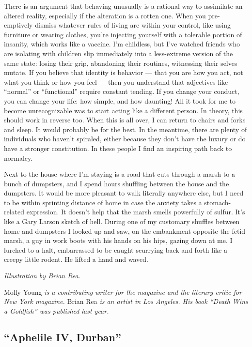 There is an argument that behaving unusually is a rational way to
assimilate an altered reality, especially if the alteration is a rotten
one. When you pre-emptively dismiss whatever rules of living are within
your control, like using furniture or wearing clothes, you're injecting
yourself with a tolerable portion of insanity, which works like a
vaccine. I'm childless, but I've watched friends who are isolating with
children slip immediately into a less-extreme version of the same state:
losing their grip, abandoning their routines, witnessing their selves
mutate. If you believe that identity is behavior --- that you are how
you act, not what you think or how you feel --- then you understand that
adjectives like ``normal'' or ``functional'' require constant tending.
If you change your conduct, you can change your life: how simple, and
how daunting! All it took for me to become unrecognizable was to start
acting like a different person. In theory, this should work in reverse
too. When this is all over, I can return to chairs and forks and sleep.
It would probably be for the best. In the meantime, there are plenty of
individuals who haven't spiraled, either because they don't have the
luxury or do have a stronger constitution. In these people I find an
inspiring path back to normalcy.

Next to the house where I'm staying is a road that cuts through a marsh
to a bunch of dumpsters, and I spend hours shuffling between the house
and the dumpsters. It would be more pleasant to walk literally anywhere
else, but I need to be within sprinting distance of home in case the
anxiety takes a stomach-related expression. It doesn't help that the
marsh smells powerfully of sulfur. It's like a Gary Larson sketch of
hell. During one of my customary shuffles between home and dumpsters I
looked up and saw, on the embankment opposite the fetid marsh, a guy in
work boots with his hands on his hips, gazing down at me. I lurched to a
halt, embarrassed to be caught scurrying back and forth like a creepy
little rodent. He lifted a hand and waved.

\emph{Illustration by Brian Rea.}

Molly Young \emph{is a contributing writer for the magazine and the
literary critic for New York magazine.} Brian Rea \emph{is an artist in
Los Angeles. His book ``Death Wins a Goldfish'' was published last
year.}

\hypertarget{aphelile-iv-durban-1}{%
\subsection{``Aphelile IV, Durban''}\label{aphelile-iv-durban-1}}

